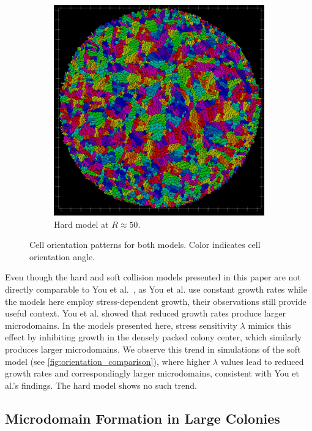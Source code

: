 \documentclass[conference]{IEEEtran}
\begin{document}
\begin{figure}[H]
\begin{subfigure}[b]{0.49\columnwidth}
        \includegraphics[width=\linewidth]{figures/orientation_comparisons/r50_hard_e-2.jpeg}
        \caption{Hard model at $R \approx 50$.}
    \end{subfigure}
    \caption{Cell orientation patterns for both models. Color indicates cell orientation angle.}
    \label{fig:orientation_comparison_small}
\end{figure}

Even though the hard and soft collision models presented in this paper are not directly comparable to You et al.~\cite{You2018}, as You et al. use constant growth rates while the models here employ stress-dependent growth, their observations still provide useful context. You et al. showed that reduced growth rates produce larger microdomains. In the models presented here, stress sensitivity $\lambda$ mimics this effect by inhibiting growth in the densely packed colony center, which similarly produces larger microdomains. We observe this trend in simulations of the soft model (see \autoref{fig:orientation_comparison}), where higher $\lambda$ values lead to reduced growth rates and correspondingly larger microdomains, consistent with You et al.'s findings. The hard model shows no such trend.

\subsection{Microdomain Formation in Large Colonies}
\end{document}
